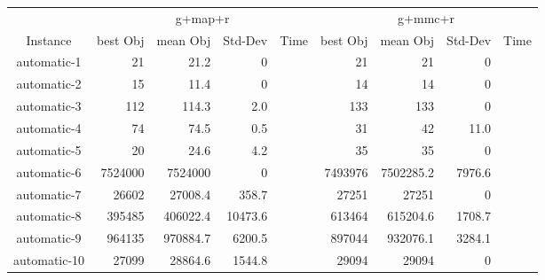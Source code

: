 \documentclass[11pt]{article}
\begin{document}
{\begin{tabular}{c|rrrr|rrrr}
	     & \multicolumn{4}{c}{g+map+r} & \multicolumn{4}{c}{g+mmc+r} \\
Instance     & best Obj & mean Obj & Std-Dev & Time  &  best Obj & mean Obj & Std-Dev & Time          \\
\hline
automatic-1  & 21       & 21.2     & 0       &           &  21       &  21      & 0       &                 \\
automatic-2  & 15       & 11.4     & 0       &           &  14       &  14      & 0       &               \\
automatic-3  & 112      & 114.3    & 2.0     &           &  133      &  133     & 0       &              \\
automatic-4  & 74       & 74.5     & 0.5     &           &  31       &  42      & 11.0    &                \\
automatic-5  & 20       & 24.6     & 4.2     &           &  35       &  35      & 0       &               \\
automatic-6  & 7524000  & 7524000  & 0       &           &  7493976  &  7502285.2& 7976.6 &                 \\
automatic-7  & 26602    & 27008.4  & 358.7   &           &  27251    &  27251   & 0       &            \\
automatic-8  & 395485   & 406022.4 & 10473.6 &           &  613464   &  615204.6& 1708.7  &           \\
automatic-9  & 964135   & 970884.7 & 6200.5  &           &  897044   &  932076.1& 3284.1  &                 \\
automatic-10 & 27099    & 28864.6  & 1544.8  &           &  29094    &  29094   & 0       &                 \\
\end{tabular}
}
\end{document}
